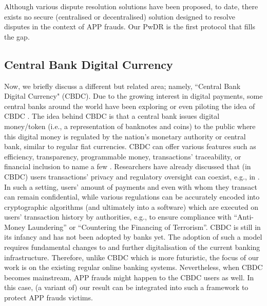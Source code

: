 Although various dispute resolution solutions have been proposed, to date, there exists no secure (centralised or decentralised) solution  designed to resolve disputes in the context of APP frauds.  Our PwDR is the first protocol that fills the gap. 

 



 

\subsection{Central Bank Digital Currency}

Now, we briefly discuss a different but related area; namely, ``Central Bank Digital Currency" (CBDC). Due to the growing interest in digital payments, some central banks around the world have been exploring or even piloting the idea of CBDC \cite{CBDC}.  The idea behind CBDC is that a central bank issues digital money/token (i.e., a representation of banknotes and coins) to the public where this digital money is regulated by the nation's monetary authority or central bank, similar to regular fiat currencies. CBDC can offer various features such as efficiency, transparency, programmable money, transactions' traceability, or financial inclusion to name a few \cite{CBDC,CBDC-core-features}. Researchers have already discussed that (in CBDC) users transactions' privacy and regulatory oversight can coexist, e.g., in \cite{abs-2103-00254,WustKCC19}. In such a setting, users' amount of payments and even with whom they transact can remain confidential, while  various regulations can be accurately encoded  into cryptographic algorithms (and ultimately into a software) which are executed on users' transaction history by  authorities, e.g., to ensure compliance with ``Anti-Money Laundering'' or ``Countering the Financing of Terrorism''.  CBDC is still in its infancy and has not been adopted by banks yet. The adoption of such a model requires fundamental changes to and further digitalisation of the current banking  infrastructure. Therefore, unlike CBDC which is more futuristic, the focus of our work is on the existing regular  online banking systems.  Nevertheless, when CBDC becomes mainstream, APP frauds  might happen to the CBDC users as well. In this case, (a variant of) our result can be integrated into  such a framework to protect  APP frauds victims.  





